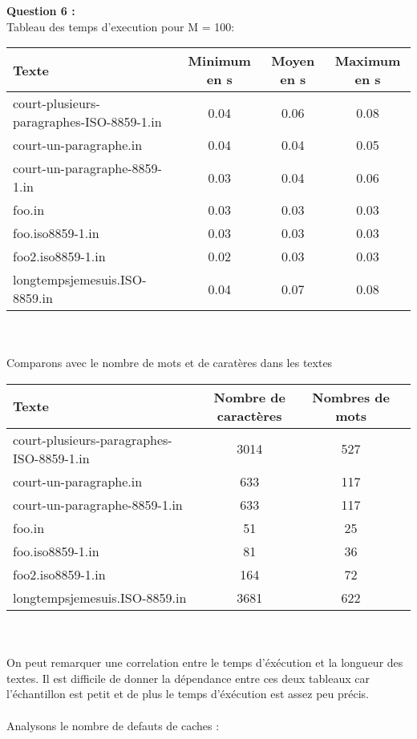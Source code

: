 \documentclass{article}
\begin{document}
\item \textbf{Question 6 : } \\
Tableau des temps d'execution pour M = 100:
\begin{center}
\begin{tabular}{|l|c|c|c|}
  \hline
  Texte & Minimum en s & Moyen en s & Maximum en s \\
  \hline
  court-plusieurs-paragraphes-ISO-8859-1.in & 0.04 & 0.06 & 0.08 \\
  court-un-paragraphe.in  & 0.04 & 0.04  & 0.05\\
  court-un-paragraphe-8859-1.in & 0.03 & 0.04 & 0.06\\
  foo.in & 0.03 & 0.03 & 0.03\\
  foo.iso8859-1.in & 0.03 & 0.03 & 0.03\\
  foo2.iso8859-1.in & 0.02 & 0.03 & 0.03\\
  longtempsjemesuis.ISO-8859.in & 0.04 & 0.07 & 0.08\\
  \hline
\end{tabular}
\end{center}
\\ \\
Comparons avec le nombre de mots et de carat\`eres dans les textes\\
\begin{tabular}{|l|c|c|c|}
  \hline
  Texte & Nombre de caract\`eres & Nombres de mots \\
  \hline
  court-plusieurs-paragraphes-ISO-8859-1.in &  3014 & 527\\
  court-un-paragraphe.in & 633 & 117 \\
  court-un-paragraphe-8859-1.in & 633 & 117\\
  foo.in & 51 & 25\\
  foo.iso8859-1.in & 81 & 36 \\
  foo2.iso8859-1.in & 164 & 72\\
  longtempsjemesuis.ISO-8859.in & 3681 & 622\\
  \hline
\end{tabular}    
\\ \\ 
On peut remarquer une correlation entre le temps d'\'ex\'ecution et la longueur des textes. Il est difficile de donner la d\'ependance entre ces deux tableaux car l'\'echantillon est petit et de plus le temps d'\'ex\'ecution est assez peu pr\'ecis.
\\ \\
Analysons le nombre de defauts de caches :\\
\end{document}
